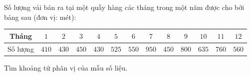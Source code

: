 \begin{ex}
Số lượng vải bán ra tại một quầy hàng các tháng trong một năm được cho bởi bảng sau (đơn vị: mét):
\begin{center}
\begin{tabular}{|c|c|c|c|c|c|c|c|c|c|c|c|c|}\hline
Tháng & $1$ & $2$ & $3$ & $4$ & $5$ & $6$ & $7$ & $8$ & $9$ & $10$ & $11$ & $12$\\\hline
Số lượng & $410$ & $430$ & $450$ & $430$ & $525$ & $550$ & $950$ & $450$ & $800$ & $635$ & $760$ & $560$\\\hline
\end{tabular}
\end{center}
Tìm khoảng tứ phân vị của mẫu số liệu.
\end{ex}
